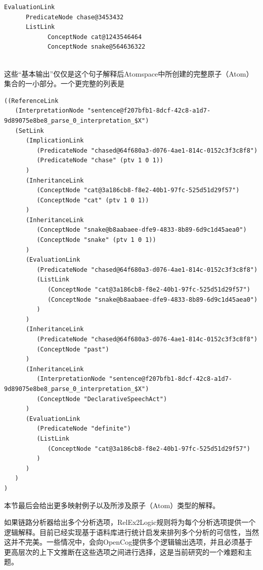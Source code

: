  {\tt\begin{small}\begin{lstlisting}
EvaluationLink 
      PredicateNode chase@3453432
      ListLink
            ConceptNode cat@1243546464
            ConceptNode snake@564636322
       
\end{lstlisting}\end{small}}

这些“基本输出”仅仅是这个句子解释后Atomspace中所创建的完整原子（Atom）集合的一小部分。一个更完整的列表是

{\tt\begin{small}\begin{lstlisting}
((ReferenceLink
   (InterpretationNode "sentence@f207bfb1-8dcf-42c8-a1d7-9d89075e8be8_parse_0_interpretation_$X")
   (SetLink
      (ImplicationLink
         (PredicateNode "chased@64f680a3-d076-4ae1-814c-0152c3f3c8f8")
         (PredicateNode "chase" (ptv 1 0 1))
      )
      (InheritanceLink
         (ConceptNode "cat@3a186cb8-f8e2-40b1-97fc-525d51d29f57")
         (ConceptNode "cat" (ptv 1 0 1))
      )
      (InheritanceLink
         (ConceptNode "snake@b8aabaee-dfe9-4833-8b89-6d9c1d45aea0")
         (ConceptNode "snake" (ptv 1 0 1))
      )
      (EvaluationLink
         (PredicateNode "chased@64f680a3-d076-4ae1-814c-0152c3f3c8f8")
         (ListLink
            (ConceptNode "cat@3a186cb8-f8e2-40b1-97fc-525d51d29f57")
            (ConceptNode "snake@b8aabaee-dfe9-4833-8b89-6d9c1d45aea0")
         )
      )
      (InheritanceLink
         (PredicateNode "chased@64f680a3-d076-4ae1-814c-0152c3f3c8f8")
         (ConceptNode "past")
      )
      (InheritanceLink
         (InterpretationNode "sentence@f207bfb1-8dcf-42c8-a1d7-9d89075e8be8_parse_0_interpretation_$X")
         (ConceptNode "DeclarativeSpeechAct")
      )
      (EvaluationLink
         (PredicateNode "definite")
         (ListLink
            (ConceptNode "cat@3a186cb8-f8e2-40b1-97fc-525d51d29f57")
         )
      )
   )
)
\end{lstlisting}\end{small}}

本节最后会给出更多映射例子以及所涉及原子（Atom）类型的解释。

如果链路分析器给出多个分析选项，RelEx2Logic规则将为每个分析选项提供一个逻辑解释。目前已经实现基于语料库进行统计启发来排列多个分析的可信性，当然这并不完美。一些情况中，会向OpenCog提供多个逻辑输出选项，并且必须基于更高层次的上下文推断在这些选项之间进行选择，这是当前研究的一个难题和主题。



